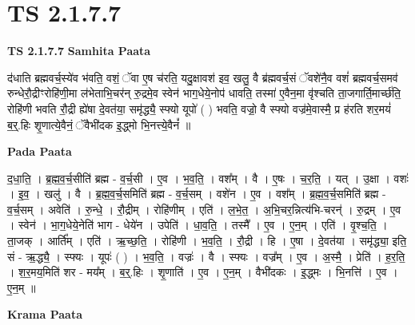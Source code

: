 \documentclass[17pt]{extarticle}
\begin{document}
\section*{ TS 2.1.7.7 }

\textbf{TS 2.1.7.7 } \newline
\textbf{Samhita Paata} \newline

द॑धाति ब्रह्मवर्च॒स्ये॑व भ॑वति॒ वशं॒ ॅवा ए॒ष च॑रति॒ यदु॒क्षावश॑ इव॒ खलु॒ वै ब्र॑ह्मवर्च॒सं ॅवशे॑नै॒व वशं॑ ब्रह्मवर्च॒समव॑ रुन्धेरौ॒द्रीꣳरोहि॑णी॒मा ल॑भेताभि॒चर॑न् रु॒द्रमे॒व स्वेन॑ भाग॒धेये॒नोप॑ धावति॒ तस्मा॑ ए॒वैन॒मा वृ॑श्चति ता॒जगार्ति॒मार्च्छ॑ति॒ रोहि॑णी भवति रौ॒द्री ह्ये॑षा दे॒वत॑या॒ समृ॑द्ध्यै॒ स्फ्यो यूपो॑ ( ) भवति॒ वज्रो॒ वै स्फ्यो वज्र॑मे॒वास्मै॒ प्र ह॑रति शर॒मयं॑ ब॒र्॒.हिः शृ॒णात्ये॒वैनं॒ ॅवैभी॑दक इ॒द्ध्मो भि॒नत्त्ये॒वैनं᳚ ॥ \newline

\textbf{Pada Paata} \newline

द॒धा॒ति॒ । ब्र॒ह्म॒व॒र्च॒सीति॑ ब्रह्म - व॒र्च॒सी । ए॒व । भ॒व॒ति॒ । वश᳚म् । वै । ए॒षः । च॒र॒ति॒ । यत् । उ॒क्षा । वशः॑ । इ॒व॒ । खलु॑ । वै । ब्र॒ह्म॒व॒र्च॒समिति॑ ब्रह्म - व॒र्च॒सम् । वशे॑न । ए॒व । वश᳚म् । ब्र॒ह्म॒व॒र्च॒समिति॑ ब्रह्म - व॒र्च॒सम् । अवेति॑ । रु॒न्धे॒ । रौ॒द्रीम् । रोहि॑णीम् । एति॑ । ल॒भे॒त॒ । अ॒भि॒चर॒न्नित्य॑भि-चरन्॑ । रु॒द्रम् । ए॒व । स्वेन॑ । भा॒ग॒धेये॒नेति॑ भाग - धेये॑न । उपेति॑ । धा॒व॒ति॒ । तस्मै᳚ । ए॒व । ए॒न॒म् । एति॑ । वृ॒श्च॒ति॒ । ता॒जक् । आर्ति᳚म् । एति॑ । ऋ॒च्छ॒ति॒ । रोहि॑णी । भ॒व॒ति॒ । रौ॒द्री । हि । ए॒षा । दे॒वत॑या । समृ॑द्ध्या॒ इति॒ सं - ऋ॒द्ध्यै॒ । स्फ्यः । यूपः॑ ( ) । भ॒व॒ति॒ । वज्रः॑ । वै । स्फ्यः । वज्र᳚म् । ए॒व । अ॒स्मै॒ । प्रेति॑ । ह॒र॒ति॒ । श॒र॒मय॒मिति॑ शर - मय᳚म् । ब॒र्॒.हिः । शृ॒णाति॑ । ए॒व । ए॒न॒म् । वैभी॑दकः । इ॒द्ध्मः । भि॒नत्ति॑ । ए॒व । ए॒न॒म् ॥  \newline


\textbf{Krama Paata} \newline
\end{document}
